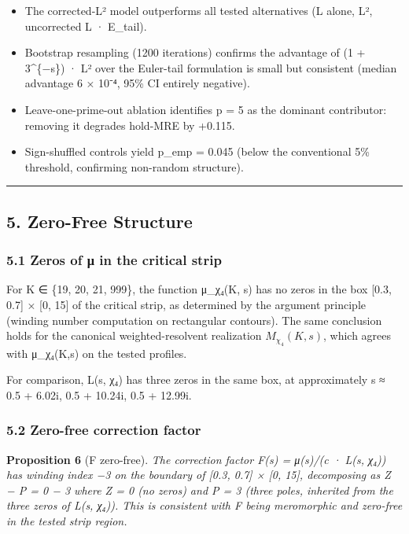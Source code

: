 \documentclass[
  11pt,
]{article}
\providecommand{\tightlist}{%
  \setlength{\itemsep}{0pt}\setlength{\parskip}{0pt}}
\begin{document}
\begin{itemize}
\tightlist
\item
  The corrected-L² model outperforms all tested alternatives (L alone, L²,
  uncorrected L · E\_tail).
\item
  Bootstrap resampling (1200 iterations) confirms the advantage of (1 +
  3\^{}\{−s\}) · L² over the Euler-tail formulation is small but consistent
  (median advantage 6 × 10⁻⁴, 95\% CI entirely negative).
\item
  Leave-one-prime-out ablation identifies p = 5 as the dominant contributor:
  removing it degrades hold-MRE by +0.115.
\item
  Sign-shuffled controls yield p\_emp = 0.045 (below the conventional 5\%
  threshold, confirming non-random structure).
\end{itemize}

\begin{center}\rule{0.5\linewidth}{0.5pt}\end{center}

\newpage

\subsection{5. Zero-Free Structure}\label{zero-free-structure}

\subsubsection{5.1 Zeros of μ in the critical
strip}\label{zeros-of-ux3bc-in-the-critical-strip}

For K ∈ \{19, 20, 21, 999\}, the function μ\_χ₄(K, s) has no zeros in the box
{[}0.3, 0.7{]} × {[}0, 15{]} of the critical strip, as determined by the
argument principle (winding number computation on rectangular contours). The
same conclusion holds for the canonical weighted-resolvent realization
\(M_{\chi_4}(K,s)\), which agrees with μ\_χ₄(K,s) on the tested profiles.

For comparison, L(s, χ₄) has three zeros in the same box, at approximately s ≈
0.5 + 6.02i, 0.5 + 10.24i, 0.5 + 12.99i.

\subsubsection{5.2 Zero-free correction
factor}\label{zero-free-correction-factor}

\textbf{Proposition 6} (F zero-free). \emph{The correction factor F(s) = μ(s)/(c
· L(s, χ₄)) has winding index −3 on the boundary of {[}0.3, 0.7{]} × {[}0,
15{]}, decomposing as Z − P = 0 − 3 where Z = 0 (no zeros) and P = 3 (three
poles, inherited from the three zeros of L(s, χ₄)). This is consistent with F
being meromorphic and zero-free in the tested strip region.}
\end{document}
